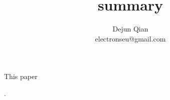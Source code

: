 \documentclass[11pt,letterpaper,oneside]{article}
\title{summary}
\author{Dejun Qian\\electronseu@gmail.com}
\date{}
\begin{document}
\maketitle

This paper 

\cite{bib:Pandita}.



\end{document}
